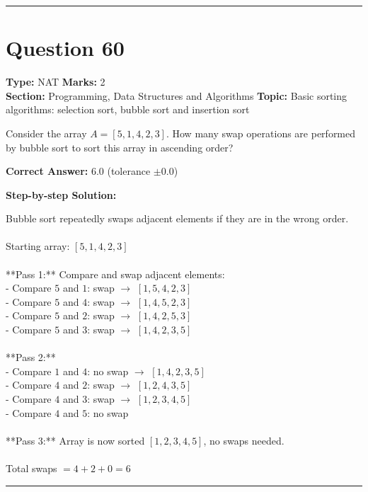 \documentclass[11pt]{article}
\begin{document}
\vspace{0.8em}
\hrule
\vspace{0.4em}
\section*{Question 60}
\textbf{Type:} NAT \hfill \textbf{Marks:} 2\\
\textbf{Section:} Programming, Data Structures and Algorithms \hfill \textbf{Topic:} Basic sorting algorithms: selection sort, bubble sort and insertion sort

Consider the array \(A = [5, 1, 4, 2, 3]\). How many swap operations are performed by bubble sort to sort this array in ascending order?



\textbf{Correct Answer:} 6.0 (tolerance \(\pm 0.0\))

\textbf{Step-by-step Solution:}

Bubble sort repeatedly swaps adjacent elements if they are in the wrong order.\\
\\
Starting array: \([5, 1, 4, 2, 3]\)\\
\\
**Pass 1:** Compare and swap adjacent elements:\\
- Compare \(5\) and \(1\): swap \(\rightarrow\) \([1, 5, 4, 2, 3]\)\\
- Compare \(5\) and \(4\): swap \(\rightarrow\) \([1, 4, 5, 2, 3]\)\\
- Compare \(5\) and \(2\): swap \(\rightarrow\) \([1, 4, 2, 5, 3]\)\\
- Compare \(5\) and \(3\): swap \(\rightarrow\) \([1, 4, 2, 3, 5]\)\\
\\
**Pass 2:**\\
- Compare \(1\) and \(4\): no swap \(\rightarrow\) \([1, 4, 2, 3, 5]\)\\
- Compare \(4\) and \(2\): swap \(\rightarrow\) \([1, 2, 4, 3, 5]\)\\
- Compare \(4\) and \(3\): swap \(\rightarrow\) \([1, 2, 3, 4, 5]\)\\
- Compare \(4\) and \(5\): no swap\\
\\
**Pass 3:** Array is now sorted \([1, 2, 3, 4, 5]\), no swaps needed.\\
\\
Total swaps \(= 4 + 2 + 0 = 6\)

\vspace{0.8em}
\hrule
\vspace{0.4em}
\end{document}

